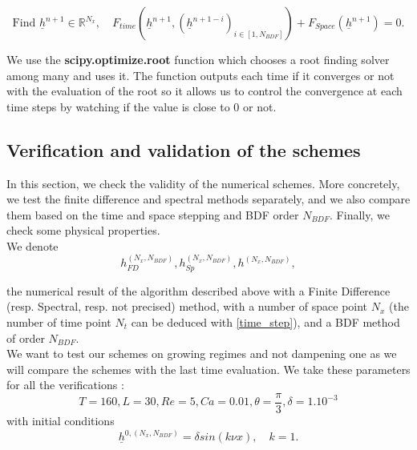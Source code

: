 \documentclass[12pt]{article}
\begin{document}
\begin{equation}
    \boxed{
    \text{Find } \underline{h}^{n+1} \in \mathbb{R}^{N_x}, \quad F_{time}(\underline{h}^{n+1}, (\underline{h}^{n+1-i})_{i\in [1, N_{BDF}]})+F_{Space}(\underline{h}^{n+1})=0.
    }
\end{equation}

We use the \textbf{scipy.optimize.root} function which chooses a root finding solver among many and uses it. The function outputs each time if it converges or not with the evaluation of the root so it allows us to control the convergence at each time steps by watching if the value is close to 0 or not. 



\subsection{Verification and validation of the schemes}
In this section, we check the validity of the numerical schemes. More concretely, we test the finite difference and spectral methods separately, and we also 
compare them based on the time and space stepping and BDF order $N_{BDF}$. Finally, we check some physical properties.
\\

We denote 
\begin{equation}
    h_{FD}^{(N_x, N_{BDF})}, h_{Sp}^{(N_x, N_{BDF})}, h^{(N_x, N_{BDF})}, 
\end{equation} 

the numerical result of the algorithm described above with a Finite Difference (resp. Spectral, resp. not precised) method, with a number of space point $N_x$ (the number of time point $N_t$ can be deduced with \eqref{time_step}), and a BDF method of order $N_{BDF}$.
\\

We want to test our schemes on growing regimes and not dampening one as we will compare the schemes with the last time evaluation. We take these parameters for 
all the verifications :
\begin{equation}\label{eq_value_variables_num_verif}
\boxed{
    T = 160, L=30, Re=5, Ca= 0.01, \theta = \frac{\pi}{3}, \delta = 1.10^{-3}
    }
\end{equation}
with initial conditions
\begin{equation}\label{eq:initial_conditions}
\boxed{
    \underline{h}^{0, (N_x, N_{BDF})} = \delta sin(k\nu x), \quad k=1.
    }
\end{equation}
\end{document}
